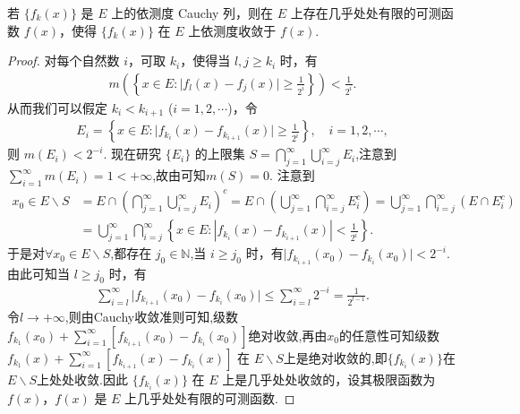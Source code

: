 \documentclass[../../main.tex]{subfiles}
\begin{document}
\begin{theorem}\label{theorem:定理3.16}
若 $\{f_k(x)\}$ 是 $E$ 上的依测度 Cauchy 列，则在 $E$ 上存在几乎处处有限的可测函数 $f(x)$，使得 $\{f_k(x)\}$ 在 $E$ 上依测度收敛于 $f(x)$.
\end{theorem}
\begin{proof}
对每个自然数 $i$，可取 $k_i$，使得当 $l,j\geqslant k_i$ 时，有
\begin{align*}
m\left(\left\{x\in E:\vert f_l(x)-f_j(x)\vert\geqslant\frac{1}{2^i}\right\}\right)<\frac{1}{2^i}.
\end{align*}
从而我们可以假定 $k_i<k_{i + 1}$ ($i = 1,2,\cdots$)，令
\begin{align*}
E_i=\left\{x\in E:\vert f_{k_i}(x)-f_{k_{i + 1}}(x)\vert\geqslant\frac{1}{2^i}\right\},\quad i = 1,2,\cdots,
\end{align*}
则 $m(E_i)<2^{-i}$. 现在研究 $\{E_i\}$ 的上限集 $S = \bigcap_{j = 1}^{\infty}\bigcup_{i = j}^{\infty}E_i$,注意到$\sum_{i = 1}^{\infty}m(E_i)=1<+\infty$,故由可知$m(S)=0$. 注意到
\begin{align*}
x_0\in E\backslash S&=E\cap \left( \bigcap_{j=1}^{\infty}{\bigcup_{i=j}^{\infty}{E_i}} \right) ^c=E\cap \left( \bigcup_{j=1}^{\infty}{\bigcap_{i=j}^{\infty}{E_{i}^{c}}} \right) =\bigcup_{j=1}^{\infty}{\bigcap_{i=j}^{\infty}{\left( E\cap E_{i}^{c} \right)}}
\\
&=\bigcup_{j=1}^{\infty}{\bigcap_{i=j}^{\infty}{\left\{ x\in E:\left| f_{k_i}\left( x \right) -f_{k_{i+1}}\left( x \right) \right|<\frac{1}{2^i} \right\}}}.
\end{align*}
于是对$\forall x_0\in E\backslash S$,都存在 $j_0\in \mathbb{N}$,当 $i\geqslant j_0$ 时，有$\vert f_{k_{i + 1}}(x_0)-f_{k_i}(x_0)\vert<2^{-i}$. 由此可知当 $l\geqslant j_0$ 时，有
\begin{align*}
\sum_{i = l}^{\infty}\vert f_{k_{i + 1}}(x_0)-f_{k_i}(x_0)\vert\leqslant \sum_{i=l}^{\infty}{2^{-i}} = \frac{1}{2^{l - 1}}.
\end{align*}
令$l\to +\infty$,则由Cauchy收敛准则可知,级数$f_{k_1}(x_0)+\sum_{i=1}^{\infty}[f_{k_{i+1}}(x_0)-f_{k_i}(x_0)]$绝对收敛,再由$x_0$的任意性可知级数$f_{k_1}(x)+\sum_{i = 1}^{\infty}[f_{k_{i + 1}}(x)-f_{k_i}(x)]$ 在 $E\backslash S$上是绝对收敛的,即$\{f_{k_i}(x)\}$在$E\backslash S$上处处收敛.因此 $\{f_{k_i}(x)\}$ 在 $E$ 上是几乎处处收敛的，设其极限函数为 $f(x)$，$f(x)$ 是 $E$ 上几乎处处有限的可测函数.


\end{proof}
\end{document}
